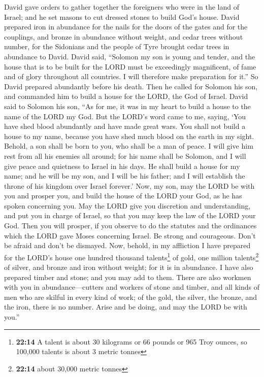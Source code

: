  David gave orders to gather together the foreigners who
were in the land of Israel; and he set masons to cut dressed stones to
build God's house.  David prepared iron in abundance for
the nails for the doors of the gates and for the couplings, and bronze
in abundance without weight,  and cedar trees without
number, for the Sidonians and the people of Tyre brought cedar trees in
abundance to David.  David said, ``Solomon my son is young
and tender, and the house that is to be built for the LORD must be
exceedingly magnificent, of fame and of glory throughout all countries.
I will therefore make preparation for it.'' So David prepared abundantly
before his death.  Then he called for Solomon his son, and
commanded him to build a house for the LORD, the God of Israel.
 David said to Solomon his son, ``As for me, it was in my
heart to build a house to the name of the LORD my God. 
But the LORD's word came to me, saying, `You have shed blood abundantly
and have made great wars. You shall not build a house to my name,
because you have shed much blood on the earth in my sight.
 Behold, a son shall be born to you, who shall be a man of
peace. I will give him rest from all his enemies all around; for his
name shall be Solomon, and I will give peace and quietness to Israel in
his days.  He shall build a house for my name; and he
will be my son, and I will be his father; and I will establish the
throne of his kingdom over Israel forever.'  Now, my son,
may the LORD be with you and prosper you, and build the house of the
LORD your God, as he has spoken concerning you.  May the
LORD give you discretion and understanding, and put you in charge of
Israel, so that you may keep the law of the LORD your God.
 Then you will prosper, if you observe to do the statutes
and the ordinances which the LORD gave Moses concerning Israel. Be
strong and courageous. Don't be afraid and don't be dismayed.
 Now, behold, in my affliction I have prepared for the
LORD's house one hundred thousand talents\footnote{\textbf{22:14} A
  talent is about 30 kilograms or 66 pounds or 965 Troy ounces, so
  100,000 talents is about 3 metric tonnes} of gold, one million
talents\footnote{\textbf{22:14} about 30,000 metric tonnes} of silver,
and bronze and iron without weight; for it is in abundance. I have also
prepared timber and stone; and you may add to them. 
There are also workmen with you in abundance---cutters and workers of
stone and timber, and all kinds of men who are skilful in every kind of
work;  of the gold, the silver, the bronze, and the iron,
there is no number. Arise and be doing, and may the LORD be with you.''

